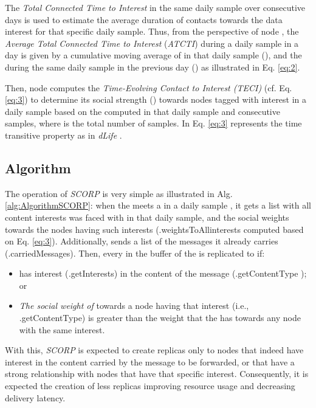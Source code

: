 \documentclass[lnicst]{svmultln}
\begin{document}
The \emph{Total Connected Time to Interest}  in the same daily
sample over consecutive days is used to estimate the average duration
of contacts towards the data interest  for that specific daily
sample. Thus, from the perspective of node , the \emph{Average
Total Connected Time to Interest}  (\emph{ATCTI}) during a daily
sample  in a day  is given by a cumulative moving
average of  in that daily sample (), and the
 during the same daily sample  in the previous
day () as illustrated in Eq. \ref{eq:2}.

{\small 

}{\small \par}

Then, node  computes the \emph{Time-Evolving Contact to Interest
 (TECI)} (cf. Eq. \ref{eq:3}) to determine its social strength
() towards nodes tagged with interest  in a daily
sample  based on the  computed in that daily
sample and consecutive  samples, where  is the total number
of samples. In Eq. \ref{eq:3}  represents
the time transitive property as in \emph{dLife} \cite{dlife}.





\subsection{Algorithm}

The operation of \emph{SCORP }is very simple as illustrated in Alg.
\ref{alg:AlgorithmSCORP}: when the  meets a \emph{}
in a daily sample , it gets a list with all content
interests \emph{} was faced with in that daily sample,
and the social weights towards the nodes having such interests (\emph{}.weightsToAllinterests
computed based on Eq. \ref{eq:3}). Additionally, \emph{}
sends a list of the messages it already carries (\emph{}.carriedMessages).
Then, every  in the buffer of the  is
replicated to \emph{ }if:
\begin{itemize}
\item \emph{} has interest (\emph{.}getInterests)
in the content of the message\linebreak{}
(.getContentType ); or\\

\item \emph{The social weight of } towards a node having that
interest\linebreak{}
(i.e., .getContentType) is greater than the weight that
the\linebreak{}
 has towards any node with the same interest.
\end{itemize}
With this, \emph{SCORP} is expected to create replicas only to nodes
that indeed have interest in the content carried by the message to
be forwarded, or that have a strong relationship with nodes that have
that specific interest. Consequently, it is expected the creation
of less replicas improving resource usage and decreasing delivery
latency.
\end{document}
